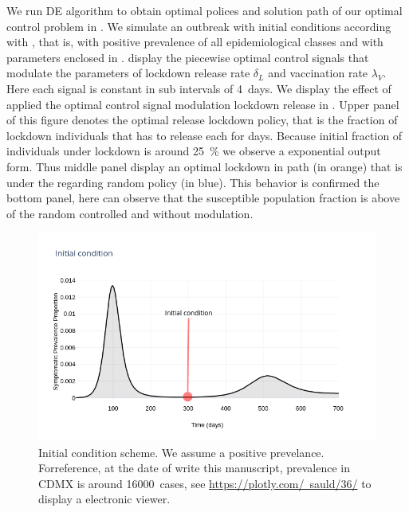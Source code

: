     We run DE algorithm to obtain optimal polices and solution path of our
    optimal control problem in . We simulate
    an outbreak with initial conditions according with
    , that is, with positive prevalence of all
    epidemiological classes and with parameters enclosed in
    .
     display the
    piecewise optimal control signals that modulate the parameters of lockdown
    release rate $\delta_L$ and vaccination rate $\lambda_V$. Here each signal
    is constant in sub intervals of \SI{4}{days}. We
    display the effect of applied the optimal control
    signal modulation lockdown release in .
    Upper panel of this figure denotes the optimal release lockdown policy,
    that is the fraction of lockdown individuals that has to release each for
    days. Because initial fraction of individuals under lockdown is around
    \SI{25}{\percent} we observe a exponential output form. Thus middle panel
    display an optimal lockdown in path (in orange) that is under the regarding
    random policy (in blue). This behavior is confirmed the bottom panel, here
    can observe that the susceptible population fraction is above of the random
    controlled and without modulation.
\begin{figure}
    \centering
    \includegraphics[scale=0.5, keepaspectratio]{figs/InitialCondition}
    \caption[Initial condition]{
        Initial condition scheme. We assume a positive
        prevelance. Forreference, at the date of write this manuscript,
        prevalence in CDMX is
        around \SI{16000}{cases}, see
        \href{https://plotly.com/~sauld/36/}{https://plotly.com/~sauld/36/}
        to display a electronic viewer.}
        \label{fig:initialcondition}
\end{figure}
